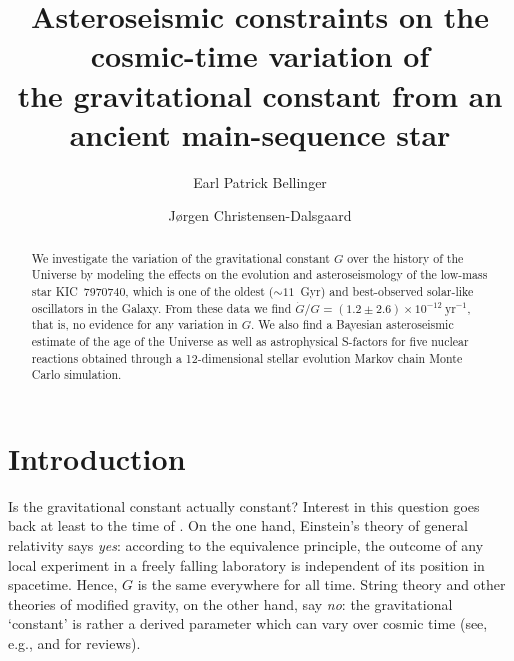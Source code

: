 \documentclass[twocolumn]{aastex63}
\newif\ifrefff
\newcommand{\mbbb}[1]{\ifrefff\textcolor{darkred}{#1}\else #1\fi}
\begin{document}
\title{\normalfont Asteroseismic constraints on the cosmic-time variation of \\the gravitational constant from an ancient main-sequence star}


\author[0000-0003-4456-4863]{Earl Patrick Bellinger} 

\author[0000-0001-5137-0966]{J{\o}rgen Christensen-Dalsgaard} 

\begin{abstract} 
    We investigate the variation of the gravitational constant $G$ over the history of the Universe by modeling the effects on the evolution and asteroseismology of the low-mass star KIC~7970740, which is one of the oldest ($\sim 11$~Gyr) and best-observed solar-like oscillators in the Galaxy. 
    From these data we find ${\dot{G}/G = \mbbb{(1.2 \pm 2.6)} \times 10^{-12}~\text{yr}^{-1}}$, that is, no evidence for any variation in $G$. 
    We also find a Bayesian asteroseismic estimate of the age of the Universe as well as astrophysical S-factors for five nuclear reactions obtained through a 12-dimensional stellar evolution Markov chain Monte Carlo simulation. 
\end{abstract}


\section{Introduction} \label{sec:intro} 
Is the gravitational constant actually constant? 
Interest in this question goes back at least to the time of \citet{1937Natur.139..323D}. 
On the one hand, Einstein's theory of general relativity says \emph{yes}: according to the equivalence principle, the outcome of any local experiment in a freely falling laboratory is independent of its position in spacetime. 
Hence, $G$ is the same everywhere for all time. 
String theory and other theories of modified gravity, on the other hand, say \emph{no}: the gravitational `constant' is rather a derived parameter which can vary over cosmic time (see, e.g., \citealt{2003RvMP...75..403U, Uzan2011} and \citealt{2011PThPh.126..993C} for reviews). 
\end{document}
